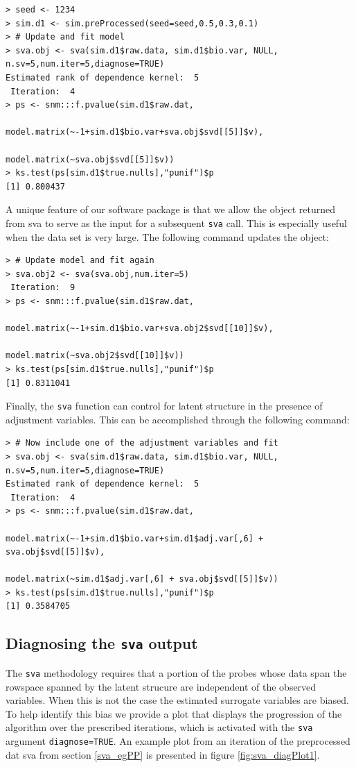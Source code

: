 \documentclass[11pt]{article}
\newcommand{\Rfunction}[1]{{\texttt{#1}}}
\begin{document}
\begin{verbatim}
> seed <- 1234 
> sim.d1 <- sim.preProcessed(seed=seed,0.5,0.3,0.1)
> # Update and fit model 
> sva.obj <- sva(sim.d1$raw.data, sim.d1$bio.var, NULL, n.sv=5,num.iter=5,diagnose=TRUE)
Estimated rank of dependence kernel:  5 
 Iteration:  4
> ps <- snm:::f.pvalue(sim.d1$raw.dat, 
											model.matrix(~-1+sim.d1$bio.var+sva.obj$svd[[5]]$v), 
											model.matrix(~sva.obj$svd[[5]]$v))
> ks.test(ps[sim.d1$true.nulls],"punif")$p
[1] 0.800437
\end{verbatim}

A unique feature of our software package is that we allow the object returned from sva to 
serve as the input for a subsequent \Rfunction{sva} call.  This is especially useful when 
the data set is very large.  The following command updates the object:
 
\begin{verbatim}
> # Update model and fit again
> sva.obj2 <- sva(sva.obj,num.iter=5)
 Iteration:  9
> ps <- snm:::f.pvalue(sim.d1$raw.dat, 
											model.matrix(~-1+sim.d1$bio.var+sva.obj2$svd[[10]]$v), 
											model.matrix(~sva.obj2$svd[[10]]$v))
> ks.test(ps[sim.d1$true.nulls],"punif")$p
[1] 0.8311041
\end{verbatim}

Finally, the \Rfunction{sva} function can control for latent structure in the presence of 
adjustment variables.  This can be accomplished through the following command:

\begin{verbatim}
> # Now include one of the adjustment variables and fit
> sva.obj <- sva(sim.d1$raw.data, sim.d1$bio.var, NULL, n.sv=5,num.iter=5,diagnose=TRUE)
Estimated rank of dependence kernel:  5 
 Iteration:  4
> ps <- snm:::f.pvalue(sim.d1$raw.dat, 
											model.matrix(~-1+sim.d1$bio.var+sim.d1$adj.var[,6] + sva.obj$svd[[5]]$v), 
											model.matrix(~sim.d1$adj.var[,6] + sva.obj$svd[[5]]$v))
> ks.test(ps[sim.d1$true.nulls],"punif")$p
[1] 0.3584705
\end{verbatim}


\subsection{Diagnosing the \Rfunction{sva} output}\label{Diagnosing}
The \Rfunction{sva} methodology requires that a portion of the probes whose data span the rowspace
spanned by the latent strucure are independent of the observed variables. When this is not the case 
the estimated surrogate variables are biased. To help identify this bias we provide a plot that 
displays the progression of the algorithm over the prescribed iterations, 
which is activated with the \Rfunction{sva} argument {\tt diagnose=TRUE}.  An example plot from 
an iteration of the preprocessed dat sva from section \ref{sva_egPP} is presented in figure \ref{fig:sva_diagPlot1}.
\end{document}
